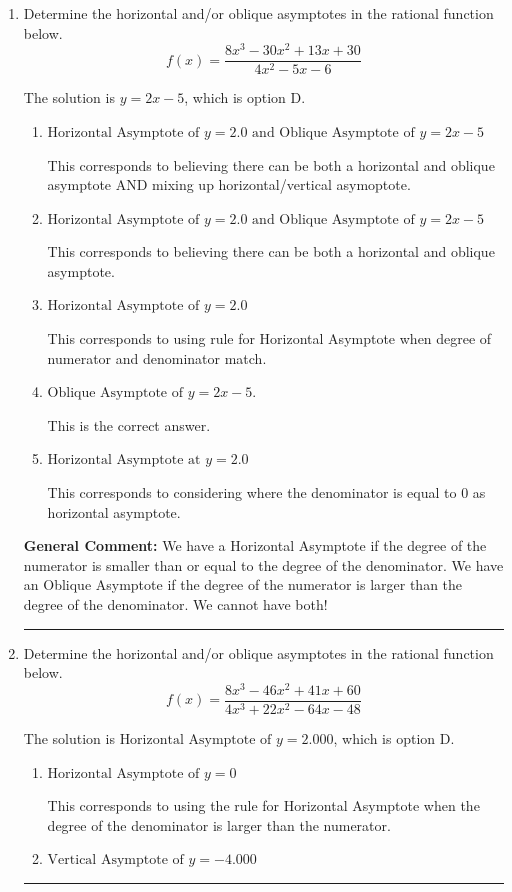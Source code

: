 \documentclass{extbook}[14pt]
\newcommand{\litem}[1]{\item #1

\rule{\textwidth}{0.4pt}}
\begin{document}
\begin{enumerate}\litem{
Determine the horizontal and/or oblique asymptotes in the rational function below.
\[ f(x) = \frac{8x^{3} -30 x^{2} +13 x + 30}{4x^{2} -5 x -6} \]

The solution is \( y = 2x -5 \), which is option D.\begin{enumerate}[label=\Alph*.]
\item \( \text{Horizontal Asymptote of } y = 2.0 \text{ and Oblique Asymptote of } y = 2x -5 \)

This corresponds to believing there can be both a horizontal and oblique asymptote AND mixing up horizontal/vertical asymoptote.
\item \( \text{Horizontal Asymptote of } y = 2.0 \text{ and Oblique Asymptote of } y = 2x -5 \)

This corresponds to believing there can be both a horizontal and oblique asymptote.
\item \( \text{Horizontal Asymptote of } y = 2.0  \)

This corresponds to using rule for Horizontal Asymptote when degree of numerator and denominator match.
\item \( \text{Oblique Asymptote of } y = 2x -5. \)

This is the correct answer.
\item \( \text{Horizontal Asymptote at } y = 2.0 \)

This corresponds to considering where the denominator is equal to 0 as horizontal asymptote.
\end{enumerate}

\textbf{General Comment:} We have a Horizontal Asymptote if the degree of the numerator is smaller than or equal to the degree of the denominator. We have an Oblique Asymptote if the degree of the numerator is larger than the degree of the denominator. We cannot have both!
}
\litem{
Determine the horizontal and/or oblique asymptotes in the rational function below.
\[ f(x) = \frac{8x^{3} -46 x^{2} +41 x + 60}{4x^{3} +22 x^{2} -64 x -48} \]

The solution is \( \text{Horizontal Asymptote of } y = 2.000  \), which is option D.\begin{enumerate}[label=\Alph*.]
\item \( \text{Horizontal Asymptote of } y = 0  \)

This corresponds to using the rule for Horizontal Asymptote when the degree of the denominator is larger than the numerator.
\item \( \text{Vertical Asymptote of } y = -4.000  \)


\end{enumerate}}
\end{enumerate}
\end{document}
